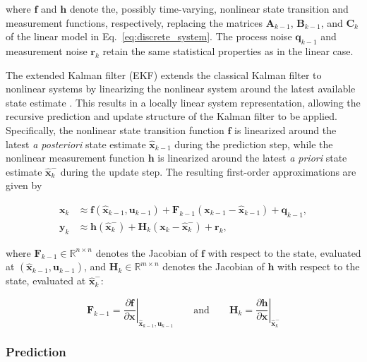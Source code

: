 where $\bm{f}$ and $\bm{h}$ denote the, possibly time-varying, nonlinear state transition and measurement functions, respectively, replacing the matrices $\bm{A}_{k-1}$, $\bm{B}_{k-1}$, and $\bm{C}_k$ of the linear model in Eq.~\eqref{eq:discrete_system}. The process noise $\bm{q}_{k-1}$ and measurement noise $\bm{r}_k$ retain the same statistical properties as in the linear case.

The extended Kalman filter (EKF) extends the classical Kalman filter to nonlinear systems by linearizing the nonlinear system around the latest available state estimate \cite{Simon2006}. This results in a locally linear system representation, allowing the recursive prediction and update structure of the Kalman filter to be applied.
Specifically, the nonlinear state transition function $\bm{f}$ is linearized around the latest \emph{a posteriori} state estimate $\hat{\bm{x}}_{k-1}$ during the prediction step, while the nonlinear measurement function $\bm{h}$ is linearized around the latest \emph{a priori} state estimate $\hat{\bm{x}}_k^-$ during the update step. The resulting first-order approximations are given by \cite{Särkkä2013KF}

\begin{align}
	\bm{x}_k 
	&\approx 
	\bm{f}(\hat{\bm{x}}_{k-1}, \bm{u}_{k-1}) + \bm{F}_{k-1}(\bm{x}_{k-1} - \hat{\bm{x}}_{k-1}) + \bm{q}_{k-1},
	\label{eq:ekf_linearization}
	\\[4pt]
	\bm{y}_k 
	&\approx 
	\bm{h}(\hat{\bm{x}}_k^-) + \bm{H}_k(\bm{x}_k - \hat{\bm{x}}_k^-) + \bm{r}_k,
	\label{eq:ekf_measurement_linearization}
\end{align}

where $\bm{F}_{k-1} \in \mathbb{R}^{n \times n}$ denotes the Jacobian of $\bm{f}$ with respect to the state, evaluated at $(\hat{\bm{x}}_{k-1}, \bm{u}_{k-1})$, and $\bm{H}_k \in \mathbb{R}^{m \times n}$ denotes the Jacobian of $\bm{h}$ with respect to the state, evaluated at $\hat{\bm{x}}_k^-$:

\begin{equation}
	\bm{F}_{k-1} 
	= 
	\left. \frac{\partial \bm{f}}{\partial \bm{x}} \right\vert_{\hat{\bm{x}}_{k-1}, \bm{u}_{k-1}}
	\qquad
	\text{and}
	\qquad
	\bm{H}_{k} 
	= 
	\left. \frac{\partial \bm{h}}{\partial \bm{x}} \right\vert_{\hat{\bm{x}}_{k}^-}
	\label{eq:jacobians}
\end{equation}





\subsubsection{Prediction}

